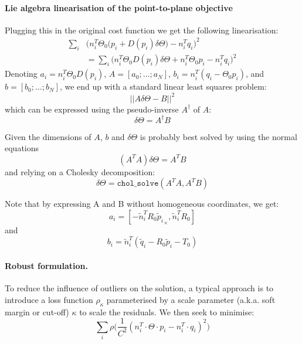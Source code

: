 \paragraph{Lie algebra linearisation of the point-to-plane objective}
Plugging this in the original cost function we get the following linearisation:
\begin{equation}
\begin{split}
\sum_i & \Big(n_i^T \Theta_0 \big(p_i + D(p_i)\delta\Theta \big) - n_i^T q_i\Big)^2
\\
&= \sum_i \Big(n_i^T \Theta_0 D(p_i)\delta\Theta + n_i^T \Theta_0 p_i - n_i^T q_i\Big)^2
\end{split}
\end{equation}
Denoting $a_i = n_i^T \Theta_0 D(p_i)$, $A=[a_0;\ldots;a_N]$,
$b_i = n_i^T (q_i - \Theta_0 p_i)$, and $b=[b_0;\ldots;b_N]$, we end up with a standard linear least squares problem:
\begin{equation}
||A \delta\Theta - B||^2
\end{equation}
which can be expressed using the pseudo-inverse $A^{\dagger}$ of $A$:
\begin{equation}
\delta\Theta = A^{\dagger} B
\end{equation}

Given the dimensions of $A$, $b$ and $\delta\Theta$ is probably best solved by using the normal equations
\begin{equation}
(A^T A) \delta\Theta = A^T B
\end{equation}
and relying on a Cholesky decomposition:
\begin{equation}
\delta\Theta = \texttt{chol\_solve}(A^T A, A^T B)
\end{equation}

Note that by expressing A and B without homogeneous coordinates, we get:
\begin{equation}
a_i = [-\tilde{n}_i^T R_0 {{\tilde{p}}_{i}}_{\times}, \tilde{n}_i^T R_0]
\end{equation}
and
\begin{equation}
b_i = \tilde{n}_i^T (\tilde{q}_i - R_0 \tilde{p}_i - T_0)
\end{equation}

\paragraph{Robust formulation.}
To reduce the influence of outliers on the solution, a typical approach is to introduce a
loss function $\rho_\kappa$ parameterised by a scale parameter (a.k.a. soft margin or cut-off) $\kappa$ to scale the residuals. We then seek to minimise:
\iffalse
\begin{equation}
\sum_i \rho\big(\frac{1}{C^2}(n_i^T \cdot \Theta \cdot p_i - n_i^T \cdot q_i)^2\big)
\end{equation}

